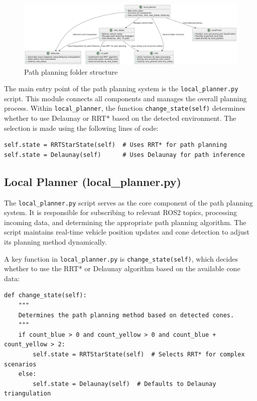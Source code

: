 \documentclass[a4paper,11pt]{report}
\begin{document}
\begin{figure}[h]
    \centering
    \includegraphics[width=\textwidth]{Images/local_planner.png}
    \caption{Path planning folder structure}
    \label{fig:path_planning_structure}
\end{figure}

The main entry point of the path planning system is the \texttt{local\_planner.py} script. This module connects all components and manages the overall planning process. Within \texttt{local\_planner}, the function \texttt{change\_state(self)} determines whether to use Delaunay or RRT* based on the detected environment. The selection is made using the following lines of code:

\begin{verbatim}
self.state = RRTStarState(self)  # Uses RRT* for path planning
self.state = Delaunay(self)      # Uses Delaunay for path inference
\end{verbatim}

\subsection{Local Planner (local\_planner.py)}
The \texttt{local\_planner.py} script serves as the core component of the path planning system. It is responsible for subscribing to relevant ROS2 topics, processing incoming data, and determining the appropriate path planning algorithm. The script maintains real-time vehicle position updates and cone detection to adjust its planning method dynamically.

A key function in \texttt{local\_planner.py} is \texttt{change\_state(self)}, which decides whether to use the RRT* or Delaunay algorithm based on the available cone data:

\begin{verbatim}
def change_state(self):
    """
    Determines the path planning method based on detected cones.
    """
    if count_blue > 0 and count_yellow > 0 and count_blue + count_yellow > 2:
        self.state = RRTStarState(self)  # Selects RRT* for complex scenarios
    else:
        self.state = Delaunay(self)  # Defaults to Delaunay triangulation
\end{verbatim}
\end{document}
